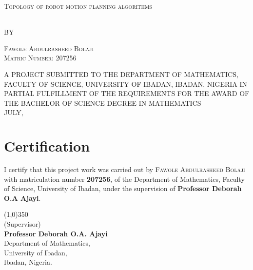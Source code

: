 \documentclass[
    a4paper,%
    12pt,%
    oneside, %
    openany, %
]{report}
\begin{document}
\baselineskip24pt

\thispagestyle{empty}
\thispagestyle{empty}

\begin{center}
    \begin{LARGE}
        \textsc{Topology of robot motion planning algorithms}
    \end{LARGE}
    \\[3em]
    {BY}\\[3em]
    \begin{large}
        \textsc{Fawole Abdulrasheed Bolaji}\\
        \textsc{Matric Number: 207256}\\[4em]
    \end{large}
    A PROJECT SUBMITTED TO THE DEPARTMENT OF MATHEMATICS, FACULTY OF SCIENCE, UNIVERSITY OF IBADAN, IBADAN, NIGERIA IN PARTIAL FULFILLMENT OF THE REQUIREMENTS FOR THE AWARD OF THE BACHELOR OF SCIENCE DEGREE IN MATHEMATICS\\[5em]
        
        JULY,
\end{center}

\newpage


\chapter*{Certification}

\renewcommand{\thepage}{\roman{page}}
I certify that this project work was carried out by \textsc{Fawole Abdulrasheed Bolaji} with matriculation number \textbf{207256}, of the Department of Mathematics, Faculty of Science, University of Ibadan, under the supervision of \textbf{Professor Deborah O.A Ajayi}.
\vspace*{3cm}
\begin{center}
    \line(1,0){350}\\
    (Supervisor)\\
    \vspace*{-0.25cm}
    \textbf{Professor Deborah O.A. Ajayi}
    \\
    \vspace*{-0.25cm}
    Department of Mathematics,
    \\
    \vspace*{-0.25cm}
    University of Ibadan,
    \\
    \vspace*{-0.25cm}
    Ibadan, Nigeria.

\end{center}
\newpage
\end{document}
